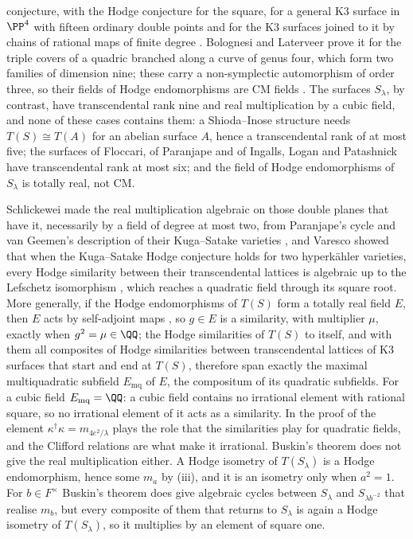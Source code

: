 \begin{remark}
conjecture, with the Hodge conjecture for the square, for a general K3
surface in $\PP^{4}$ with fifteen ordinary double points and for the K3
surfaces joined to it by chains of rational maps of finite degree
\cite[Theorems~1.5, 4.8 and~6.4]{ILP22}. Bolognesi and Laterveer prove it for
the triple covers of a quadric branched along a curve of genus four, which
form two families of dimension nine; these carry a non-symplectic
automorphism of order three, so their fields of Hodge endomorphisms are CM
fields \cite{BL24}. The surfaces $S_{\lambda}$, by contrast, have
transcendental rank nine and real multiplication by a cubic field, and none
of these cases contains them: a Shioda--Inose structure needs
$T(S)\cong T(A)$ for an abelian surface $A$, hence a transcendental rank of at
most five; the surfaces of Floccari, of Paranjape and of Ingalls, Logan and
Patashnick have transcendental rank at most six; and the field of Hodge
endomorphisms of $S_{\lambda}$ is totally real, not CM.

Schlickewei made the real multiplication algebraic on those double planes
that have it, necessarily by a field of degree at most two, from Paranjape's
cycle and van Geemen's description of their Kuga--Satake varieties
\cite{Sch10,vG08}, and Varesco showed that when the Kuga--Satake Hodge
conjecture holds for two hyperk\"ahler varieties, every Hodge similarity
between their transcendental lattices is algebraic up to the Lefschetz
isomorphism \cite{Var23}, which reaches a quadratic field through its square
root. More generally, if the Hodge endomorphisms of $T(S)$ form a totally
real field $E$, then $E$ acts by self-adjoint maps \cite{Zar83}, so $g\in E$
is a similarity, with multiplier $\mu$, exactly when $g^{2}=\mu\in\QQ$; the
Hodge similarities of $T(S)$ to itself, and with them all composites of Hodge
similarities between transcendental lattices of K3 surfaces that start and
end at $T(S)$, therefore span exactly the maximal multiquadratic subfield
$E_{\mathrm{mq}}$ of $E$, the compositum of its quadratic subfields. For a
cubic field $E_{\mathrm{mq}}=\QQ$: a cubic field contains no irrational
element with rational square, so no irrational element of it acts as a
similarity. In the proof of  the element
$\kappa^{\dagger}\kappa=m_{4e^{2}/\lambda}$ plays the role that the
similarities play for quadratic fields, and the Clifford relations are what
make it irrational. Buskin's theorem \cite{Bus19} does not give the real
multiplication either. A Hodge isometry of $T(S_{\lambda})$ is a Hodge
endomorphism, hence some $m_{a}$ by (iii), and it is an
isometry only when $a^{2}=1$. For $b\in F^{\times}$ Buskin's theorem does give
algebraic cycles between $S_{\lambda}$ and $S_{\lambda b^{-2}}$ that realise
$m_{b}$, but every composite of them that returns to $S_{\lambda}$ is again a
Hodge isometry of $T(S_{\lambda})$, so it multiplies by an element of square
one.


\end{remark}
